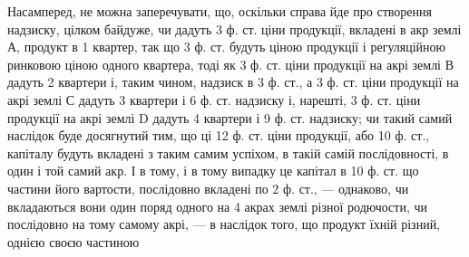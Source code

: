 Насамперед, не можна заперечувати, що, оскільки справа йде про створення
надзиску, цілком байдуже, чи дадуть 3 ф. ст. ціни продукції, вкладені в акр
землі А, продукт в 1 квартер, так що 3 ф. ст. будуть ціною продукції і регуляційною
ринковою ціною одного квартера, тоді як 3 ф. ст. ціни продукції на акрі землі
В дадуть 2 квартери і, таким чином, надзиск в 3 ф. ст., а 3 ф. ст. ціни продукції
на акрі землі С дадуть 3 квартери і 6 ф. ст. надзиску і, нарешті, 3 ф. ст. ціни
продукції на акрі землі D дадуть 4 квартери і 9 ф. ст. надзиску; чи такий самий
наслідок буде досягнутий тим, що ці 12 ф. ст. ціни продукції, або 10 ф. ст.,
капіталу будуть вкладені з таким самим успіхом, в такій самій послідовності,
в один і той самий акр. І в тому, і в тому випадку це капітал в 10 ф. ст.
що частини його вартости, послідовно вкладені по 2  ф. ст., — однаково, чи вкладаються
вони один поряд одного на 4 акрах землі різної родючости, чи послідовно на
тому самому акрі, — в наслідок того, що продукт їхній різний, однією своєю частиною
\parbreak{}  %
